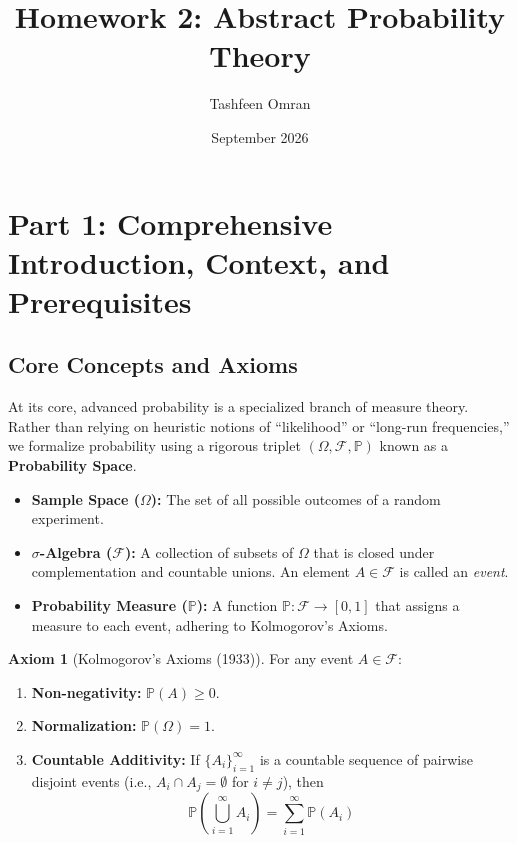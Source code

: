 \documentclass[11pt]{article}
\title{\textbf{Homework 2: Abstract Probability Theory}}
\author{Tashfeen Omran}
\date{September 2026}
\theoremstyle{definition}
\newtheorem{axiom}{Axiom}[section]
\theoremstyle{remark}
\newcommand{\F}{\mathcal{F}}
\newcommand{\Prob}{\mathbb{P}}
\begin{document}
\maketitle
\tableofcontents
\newpage

\section{Part 1: Comprehensive Introduction, Context, and Prerequisites}

\subsection{Core Concepts and Axioms}
At its core, advanced probability is a specialized branch of measure theory. Rather than relying on heuristic notions of ``likelihood'' or ``long-run frequencies,'' we formalize probability using a rigorous triplet $(\Omega, \F, \Prob)$ known as a \textbf{Probability Space}.
\begin{itemize}
    \item \textbf{Sample Space ($\Omega$):} The set of all possible outcomes of a random experiment.
    \item \textbf{$\sigma$-Algebra ($\F$):} A collection of subsets of $\Omega$ that is closed under complementation and countable unions. An element $A \in \F$ is called an \textit{event}.
    \item \textbf{Probability Measure ($\Prob$):} A function $\Prob: \F \to [0,1]$ that assigns a measure to each event, adhering to Kolmogorov's Axioms.
\end{itemize}

\begin{axiom}[Kolmogorov's Axioms (1933)]
For any event $A \in \F$:
\begin{enumerate}
    \item \textbf{Non-negativity:} $\Prob(A) \ge 0$.
    \item \textbf{Normalization:} $\Prob(\Omega) = 1$.
    \item \textbf{Countable Additivity:} If $\{A_i\}_{i=1}^{\infty}$ is a countable sequence of pairwise disjoint events (i.e., $A_i \cap A_j = \emptyset$ for $i \neq j$), then 
    \[ \Prob\left(\bigcup_{i=1}^{\infty} A_i\right) = \sum_{i=1}^{\infty} \Prob(A_i) \]
\end{enumerate}
\end{axiom}
\end{document}
